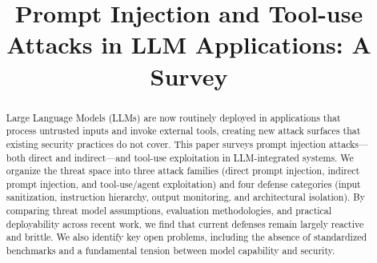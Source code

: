 \documentclass[conference]{IEEEtran}
\begin{document}
\title{Prompt Injection and Tool-use Attacks in LLM Applications: A Survey}

\author{
\and
{}
\and
{}
\and
{}
\and
{}
}

\maketitle

\begin{abstract}
Large Language Models (LLMs) are now routinely deployed in applications that
process untrusted inputs and invoke external tools, creating new attack surfaces
that existing security practices do not cover. This paper surveys prompt
injection attacks---both direct and indirect---and tool-use exploitation in
LLM-integrated systems. We organize the threat space into three attack families
(direct prompt injection, indirect prompt injection, and tool-use/agent
exploitation) and four defense categories (input sanitization, instruction
hierarchy, output monitoring, and architectural isolation). By comparing threat
model assumptions, evaluation methodologies, and practical deployability across
recent work, we find that current defenses remain largely reactive and brittle.
We also identify key open problems, including the absence of standardized
benchmarks and a fundamental tension between model capability and security.
\end{abstract}










\balance


\end{document}
